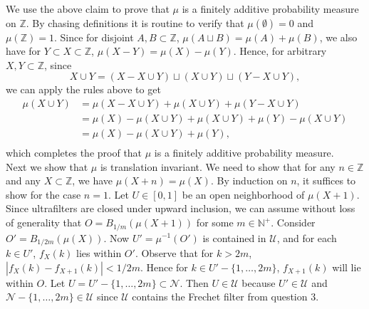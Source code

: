 \documentclass{article}
\begin{document}
\begin{enumerate}
    We use the above claim to prove that $\mu$ is a finitely additive
    probability measure on $\mathbb{Z}$. By chasing definitions it is
    routine to verify that $\mu(\emptyset)=0$ and $\mu(\mathbb{Z})=1$.
    Since for disjoint $A,B\subset\mathbb{Z}$, $\mu(A\sqcup
    B)=\mu(A)+\mu(B)$, we also have for $Y\subset X\subset\mathbb{Z}$,
    $\mu(X-Y)=\mu(X)-\mu(Y)$. Hence, for arbitrary $X,Y\subset\mathbb{Z}$,
    since
    \begin{equation*}
      X\cup Y = (X-X\cup Y)\sqcup(X\cup Y)\sqcup(Y-X\cup Y),
    \end{equation*}
    we can apply the rules above to get
    \begin{align*}
      \mu(X\cup Y) &= \mu(X-X\cup Y)+\mu(X\cup Y)+\mu(Y-X\cup Y) \\
                   &= \mu(X)-\mu(X\cup Y)+\mu(X\cup Y)+\mu(Y)-\mu(X\cup Y) \\
                   &= \mu(X)-\mu(X\cup Y)+\mu(Y), \\
    \end{align*}
    which completes the proof that $\mu$ is a finitely additive probability
    measure. \\

    Next we show that $\mu$ is translation invariant. We need to show that
    for any $n\in\mathbb{Z}$ and any $X\subset\mathbb{Z}$, we have
    $\mu(X+n)=\mu(X)$. By induction on $n$, it suffices to show for the
    case $n=1$. Let $U\in[0,1]$ be an open neighborhood of $\mu(X+1)$.
    Since ultrafilters are closed under upward inclusion, we can assume
    without loss of generality that $O=B_{1/m}(\mu(X+1))$ for some
    $m\in\mathbb{N}^+$. Consider $O'=B_{1/2m}(\mu(X))$. Now
    $U'=\mu^{-1}(O')$ is contained in $\mathcal{U}$, and for each $k\in
    U'$, $f_X(k)$ lies within $O'$. Observe that for $k>2m$,
    $|f_X(k)-f_{X+1}(k)|<1/2m$. Hence for $k\in U'-\{1,\ldots,2m\}$,
    $f_{X+1}(k)$ will lie within $O$. Let
    $U=U'-\{1,\ldots,2m\}\subset\mathcal{N}$. Then $U\in\mathcal{U}$
    because $U'\in\mathcal{U}$ and
    $\mathcal{N}-\{1,\ldots,2m\}\in\mathcal{U}$ since $\mathcal{U}$
    contains the Frechet filter from question 3.
\end{enumerate}
\end{document}
